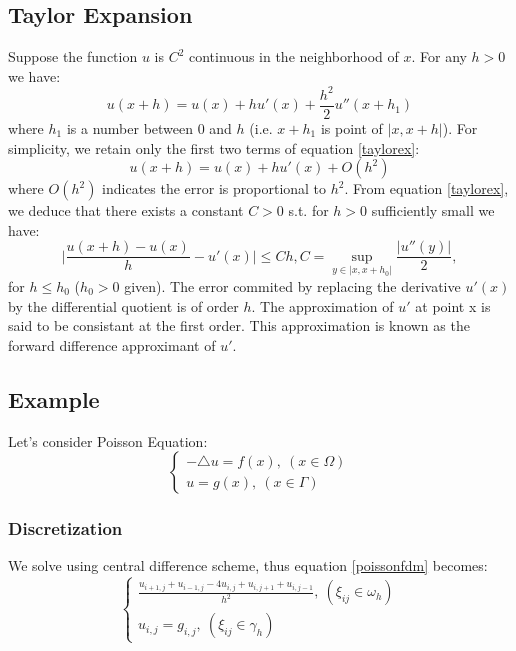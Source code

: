 \documentclass[a4paper,12pt]{article}
\begin{document}
\subsection{Taylor Expansion}
Suppose the function $u$ is $C^2$ continuous in the neighborhood of $x$. For any $h>0$ we have:
\begin{equation}\label{taylorex}
u(x+h) = u(x) + hu'(x) + \frac{h^2}{2}u''(x+h_1)
\end{equation}
where $h_1$ is a number between 0 and $h$ (i.e. $x+h_1$ is point of $|x,x+h|$). For simplicity, we retain only the first two terms of equation \ref{taylorex}:
\begin{equation*}
u(x+h) = u(x) + hu'(x) + O(h^2)
\end{equation*}
where $O(h^2)$ indicates the error is proportional to $h^2$. From equation \ref{taylorex}, we deduce that there exists a constant $C>0$ s.t. for $h>0$ sufficiently small we have:
\begin{equation*}
\bigg| \frac{u(x+h)-u(x)}{h} - u'(x) \bigg| \leq Ch, C=\sup_{y\in |x,x+h_0|} \frac{|u''(y)|}{2},
\end{equation*}
for $h\leq h_0$ ($h_0 > 0$ given). The error commited by replacing the derivative $u'(x)$ by the differential quotient is of order $h$. The approximation of $u'$ at point x is said to be consistant at the first order. This approximation is known as the forward difference approximant of $u'$.
\fi

\subsection{Example}
Let's consider Poisson Equation:
\begin{equation}
\begin{cases}\label{poissonfdm}
-\triangle u = f(x),\ (x\in \Omega)\\
u=g(x),\ (x\in \Gamma)
\end{cases}
\end{equation}
\subsubsection{Discretization}
We solve using central difference scheme, thus equation \ref{poissonfdm} becomes:
\begin{equation}
\begin{cases}
\frac{u_{i+1,j}+u_{i-1,j}-4u_{i,j}+u_{i,j+1}+u_{i,j-1}}{h^2},\ (\xi_{ij}\in \omega_h)\\
u_{i,j} = g_{i,j},\ (\xi_{ij}\in \gamma_h)
\end{cases}
\end{equation}
\end{document}
